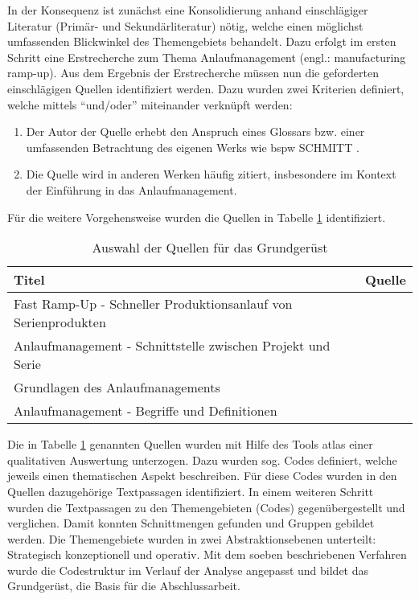 In der Konsequenz ist zunächst eine Konsolidierung anhand einschlägiger Literatur (Primär- und Sekundärliteratur) nötig, welche einen möglichst umfassenden Blickwinkel des Themengebiets behandelt. Dazu erfolgt im ersten Schritt eine Erstrecherche zum Thema Anlaufmanagement (engl.: manufacturing ramp-up). Aus dem Ergebnis der Erstrecherche müssen nun die geforderten einschlägigen Quellen identifiziert werden. Dazu wurden zwei Kriterien definiert, welche mittels ``und/oder'' miteinander verknüpft werden: 
\begin{enumerate}
 \item Der Autor der Quelle erhebt den Anspruch eines Glossars bzw. einer umfassenden Betrachtung des eigenen Werks wie \gls{bspw} SCHMITT \autocite{Schmitt2015}. 
 \item Die Quelle wird in anderen Werken häufig zitiert, insbesondere im Kontext der Einführung in das Anlaufmanagement. 
\end{enumerate}

Für die weitere Vorgehensweise wurden die Quellen in Tabelle \ref{tab:quellengrundgeruest} identifiziert. 
% 
\begin{table}[h]
\caption{ Auswahl der Quellen für das Grundgerüst} \label{tab:quellengrundgeruest} 
\begin{center}
\begin{tabular}{l l}
\textbf{Titel} & \textbf{Quelle} \\ \hline
Fast Ramp-Up - Schneller Produktionsanlauf von Serienprodukten & \autocite{Kuhn2002} \\
Anlaufmanagement - Schnittstelle zwischen Projekt und Serie & \autocite{Bischoff2007} \\
Grundlagen des Anlaufmanagements & \autocite{Schuh2008} \\
Anlaufmanagement - Begriffe und Definitionen & \autocite{Schmitt2015} 
 \end{tabular} 
 \end{center}
\end{table}
% 
% 
Die in Tabelle \ref{tab:quellengrundgeruest} genannten Quellen wurden mit Hilfe des Tools \gls{atlas} 
einer qualitativen Auswertung unterzogen. Dazu wurden sog. Codes definiert, welche jeweils einen thematischen Aspekt beschreiben. Für diese Codes wurden in den Quellen dazugehörige Textpassagen identifiziert. In einem weiteren Schritt wurden die Textpassagen zu den Themengebieten (Codes) gegenübergestellt und verglichen. Damit konnten Schnittmengen gefunden und Gruppen gebildet werden. Die Themengebiete wurden in zwei Abstraktionsebenen unterteilt: Strategisch konzeptionell und operativ.
Mit dem soeben beschriebenen Verfahren wurde die Codestruktur im Verlauf der Analyse angepasst und bildet das Grundgerüst, die Basis für die Abschlussarbeit. 

